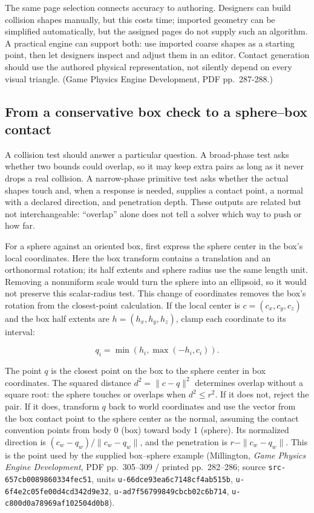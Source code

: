 The same page selection connects accuracy to authoring. Designers can build collision shapes manually, but this costs time; imported geometry can be simplified automatically, but the assigned pages do not supply such an algorithm. A practical engine can support both: use imported coarse shapes as a starting point, then let designers inspect and adjust them in an editor. Contact generation should use the authored physical representation, not silently depend on every visual triangle. (Game Physics Engine Development, PDF pp.~287-288.)

\subsection{From a conservative box check to a sphere--box contact}\label{06-engine-ii-ch033-from-a-conservative-box-check-to-a-spherebox-contact}

A collision test should answer a particular question. A broad-phase test asks whether two bounds could overlap, so it may keep extra pairs as long as it never drops a real collision. A narrow-phase primitive test asks whether the actual shapes touch and, when a response is needed, supplies a contact point, a normal with a declared direction, and penetration depth. These outputs are related but not interchangeable: ``overlap'' alone does not tell a solver which way to push or how far.

For a sphere against an oriented box, first express the sphere center in the box's local coordinates. Here the box transform contains a translation and an orthonormal rotation; its half extents and sphere radius use the same length unit. Removing a nonuniform scale would turn the sphere into an ellipsoid, so it would not preserve this scalar-radius test. This change of coordinates removes the box's rotation from the closest-point calculation. If the local center is \(c=(c_x,c_y,c_z)\) and the box half extents are \(h=(h_x,h_y,h_z)\), clamp each coordinate to its interval:

\[
q_i=\min(h_i,\max(-h_i,c_i)).
\]

The point \(q\) is the closest point on the box to the sphere center in box coordinates. The squared distance \(d^2=\|c-q\|^2\) determines overlap without a square root: the sphere touches or overlaps when \(d^2\le r^2\). If it does not, reject the pair. If it does, transform \(q\) back to world coordinates and use the vector from the box contact point to the sphere center as the normal, assuming the contact convention points from body 0 (box) toward body 1 (sphere). Its normalized direction is \((c_w-q_w)/\|c_w-q_w\|\), and the penetration is \(r-\|c_w-q_w\|\). This is the point used by the supplied box--sphere example (Millington, \emph{Game Physics Engine Development}, PDF pp.~305--309 / printed pp.~282--286; source \texttt{src-657cb0089860334fec51}, units \texttt{u-66dce93ea6c7148cf4ab515b}, \texttt{u-6f4e2c05fe00d4cd342d9e32}, \texttt{u-ad7f56799849cbcb02c6b714}, \texttt{u-c800d0a78969af102504d0b8}).

